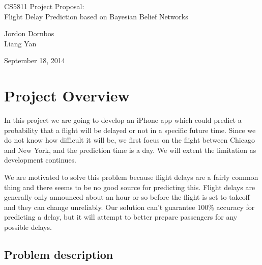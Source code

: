 \documentclass[12pt]{article}
\begin{document}
\begin{center}
{\large CS5811 Project Proposal:}\\
{\large Flight Delay Prediction based on Bayesian Belief Networks}

{\small Jordon Dornbos\\}
{\small Liang Yan\\}

{\small September 18, 2014\\}

\end{center}

\section{Project Overview}


In this project we are going to develop an iPhone app which could
predict a probability that a flight will be delayed or not in a
specific future time. Since we do not know how difficult it will be,
we first focus on the flight between Chicago and New York, and the
prediction time is a day. We will extent the limitation as development 
continues.  
 
We are motivated to solve this problem because flight delays are a
fairly common thing and there seems to be no good source for
predicting this. Flight delays are generally only announced about an
hour or so before the flight is set to takeoff and they can change
unreliably. Our solution can't guarantee 100\% accuracy for predicting
a delay, but it will attempt to better prepare passengers for any
possible delays. 

\subsection{Problem description}
\label{sec:problem-desc}
\end{document}
